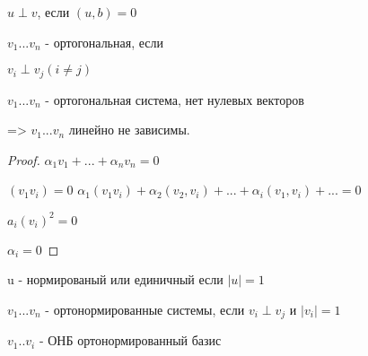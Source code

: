  \begin{definition}
    $u \perp v$, если $(u, b) = 0$
 \end{definition}

 $v_1 ... v_n$ - ортогональная, если 

 $v_i \perp v_j (i \neq j)$

 \begin{theorem}
    $v_1 ... v_n$ - ортогональная система, нет нулевых векторов

    => $v_1 ... v_n$ линейно не зависимы.
 \end{theorem}

 \begin{proof}
    
    $\alpha_1 v_1 + ... + \alpha_n v_n = 0$

    $(v_1 v_i) = 0$
    $\alpha_1 (v_1 v_i) + \alpha_2 (v_2, v_i) + ... + \alpha_i (v_1, v_i) + ... = 0$
    
    $a_i (v_i)^2 = 0$

    $\alpha_i = 0$
 \end{proof}

 \begin{definition}
    u - нормированый или единичный если $|u| = 1$

    $v_1 ... v_n$ - ортонормированные системы, если $v_i \perp v_j$ и $|v_i| = 1$

    $v_1 .. v_i$ - ОНБ ортонормированный базис
 \end{definition}